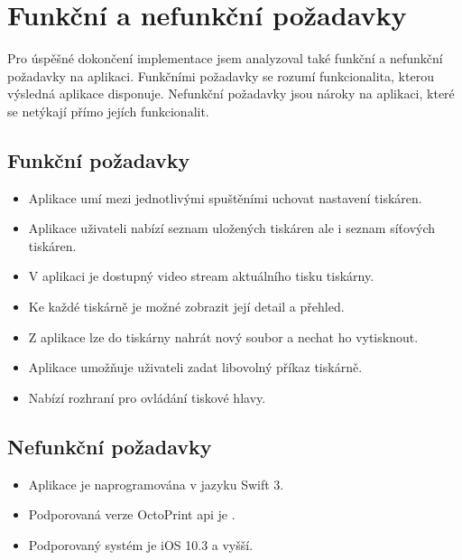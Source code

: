 \section{Funkční a nefunkční požadavky}

Pro úspěšné dokončení implementace jsem analyzoval také funkční a nefunkční požadavky na aplikaci.
Funkčními požadavky se rozumí funkcionalita, kterou výsledná aplikace disponuje.
Nefunkční požadavky jsou nároky na aplikaci, které se netýkají přímo jejích funkcionalit.

\subsection{Funkční požadavky}

\begin{itemize}
    \item Aplikace umí mezi jednotlivými spuštěními uchovat nastavení tiskáren.
    \item Aplikace uživateli nabízí seznam uložených tiskáren ale i seznam síťových tiskáren.
    \item V aplikaci je dostupný video stream aktuálního tisku tiskárny.
    \item Ke každé tiskárně je možné zobrazit její detail a přehled.
    \item Z aplikace lze do tiskárny nahrát nový soubor a nechat ho vytisknout.
    \item Aplikace umožňuje uživateli zadat libovolný příkaz tiskárně.
    \item Nabízí rozhraní pro ovládání tiskové hlavy.
\end{itemize}

\subsection{Nefunkční požadavky}

\begin{itemize}
    \item Aplikace je naprogramována v jazyku Swift 3.
    \item Podporovaná verze OctoPrint \acrshort{api} je \vapi{}.
    \item Podporovaný systém je iOS 10.3 a vyšší.
\end{itemize}